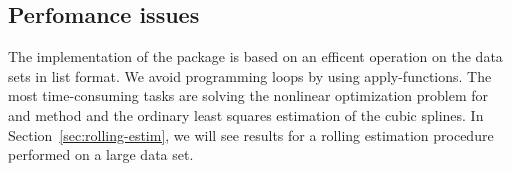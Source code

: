 \subsection{Perfomance issues}
\label{sec:perfomance-issues}

The implementation of the  package is based on an efficent operation on the data sets in list format. We avoid programming loops by using apply-functions. The most time-consuming tasks are solving the nonlinear optimization problem for \cite{Nelson1987} and \cite{Svensson1994} method and the ordinary least squares estimation of the \cite{McCulloch1975} cubic splines. In Section~\ref{sec:rolling-estim}, we will see results for a rolling estimation procedure performed on a large data set.


